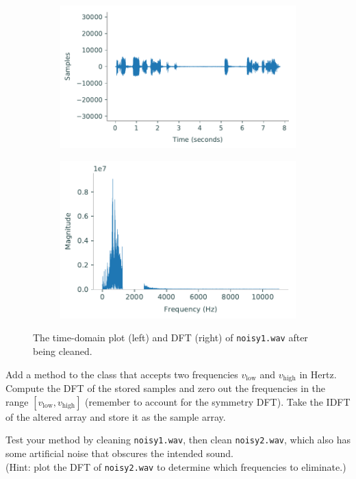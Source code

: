 \begin{figure}[H]
\captionsetup[subfigure]{justification=centering}
\centering
\begin{subfigure}{.53\textwidth}
    \centering
    \includegraphics[width=\linewidth]{figures/noisy1_clean.pdf}
\end{subfigure}%
\begin{subfigure}{.47\textwidth}
    \centering
    \includegraphics[width=\linewidth]{figures/noisy1_clean_dft.pdf}
\end{subfigure}
\caption{The time-domain plot (left) and DFT (right) of \texttt{noisy1.wav} after being cleaned.}
\label{fig:fft-noisy-cleaned}
\end{figure}

\begin{problem} %
\label{prob:fft-filter-frequencies}
Add a method to the  class that accepts two frequencies $v_\text{low}$ and $v_\text{high}$ in Hertz.
Compute the DFT of the stored samples and zero out the frequencies in the range $[v_\text{low}, v_\text{high}]$ (remember to account for the symmetry DFT).
Take the IDFT of the altered array and store it as the sample array.

Test your method by cleaning \texttt{noisy1.wav}, then clean \texttt{noisy2.wav}, which also has some artificial noise that obscures the intended sound.
\\(Hint: plot the DFT of \texttt{noisy2.wav} to determine which frequencies to eliminate.)
\end{problem}

